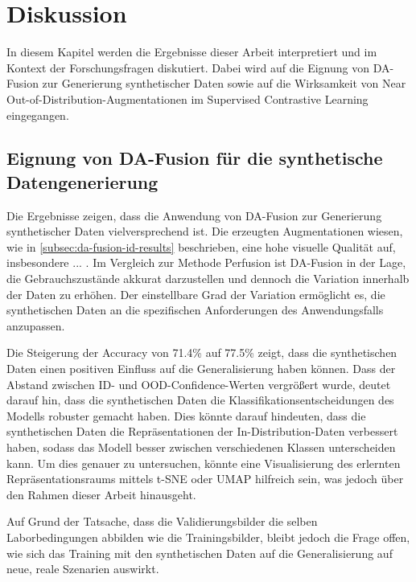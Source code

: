\chapter{Diskussion} \label{ch:discussion}

In diesem Kapitel werden die Ergebnisse dieser Arbeit interpretiert und im Kontext der Forschungsfragen diskutiert. Dabei wird auf die Eignung von DA-Fusion zur Generierung synthetischer Daten sowie auf die Wirksamkeit von Near Out-of-Distribution-Augmentationen im Supervised Contrastive Learning eingegangen.

\section{Eignung von DA-Fusion für die synthetische Datengenerierung} \label{sec:da-fusion-discussion}

Die Ergebnisse zeigen, dass die Anwendung von DA-Fusion zur Generierung synthetischer Daten vielversprechend ist. Die erzeugten Augmentationen wiesen, wie in \autoref{subsec:da-fusion-id-results} beschrieben, eine hohe visuelle Qualität auf, insbesondere ... . Im Vergleich zur Methode Perfusion ist DA-Fusion in der Lage, die Gebrauchszustände akkurat darzustellen und dennoch die Variation innerhalb der Daten zu erhöhen. Der einstellbare Grad der Variation ermöglicht es, die synthetischen Daten an die spezifischen Anforderungen des Anwendungsfalls anzupassen.

Die Steigerung der Accuracy von 71.4\% auf 77.5\% zeigt, dass die synthetischen Daten einen positiven Einfluss auf die Generalisierung haben können. Dass der Abstand zwischen ID- und OOD-Confidence-Werten vergrößert wurde, deutet darauf hin, dass die synthetischen Daten die Klassifikationsentscheidungen des Modells robuster gemacht haben. Dies könnte darauf hindeuten, dass die synthetischen Daten die Repräsentationen der In-Distribution-Daten verbessert haben, sodass das Modell besser zwischen verschiedenen Klassen unterscheiden kann. Um dies genauer zu untersuchen, könnte eine Visualisierung des erlernten Repräsentationsraums mittels t-SNE \parencite{Vandermaaten2008tsne} oder UMAP \parencite{Mcinnes2020umap} hilfreich sein, was jedoch über den Rahmen dieser Arbeit hinausgeht.

Auf Grund der Tatsache, dass die Validierungsbilder die selben Laborbedingungen abbilden wie die Trainingsbilder, bleibt jedoch die Frage offen, wie sich das Training mit den synthetischen Daten auf die Generalisierung auf neue, reale Szenarien auswirkt.

